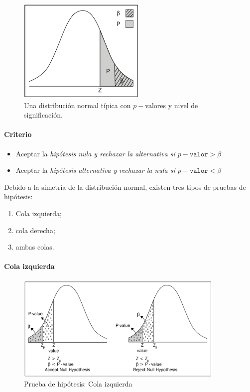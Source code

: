 \begin{figure}[h]
 \centering
 \includegraphics[height=5cm,keepaspectratio=true]{./images/kum0402.png}
 \caption{Una distribución normal típica con $p-$valores y nivel de significación.}
 \label{fig:0402}
\end{figure}


\paragraph{Criterio}
\begin{itemize}
 \item Aceptar la \emph{hipótesis nula y rechazar la alternativa si $p-\texttt{valor}>\beta$}
 \item Aceptar la \emph{hipótesis alternativa y rechazar la nula si $p-\texttt{valor}<\beta$}
\end{itemize}



Debido a la simetría de la distribución normal, existen tres tipos de pruebas de hipótesis:
\begin{enumerate}
 \item Cola izquierda;
 \item cola derecha;
 \item ambas colas.
\end{enumerate}


\paragraph{Cola izquierda}
\begin{figure}[h]
 \centering
 \includegraphics[width=10cm,keepaspectratio=true]{./images/kum0403.png}
 \caption{Prueba de hipótesis: Cola izquierda}
 \label{kum0403}
\end{figure}


